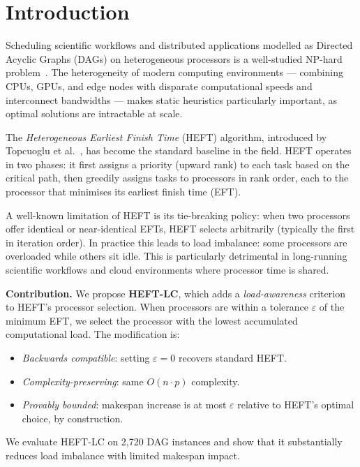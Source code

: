 \documentclass[conference]{IEEEtran}
\begin{document}
\section{Introduction}

Scheduling scientific workflows and distributed applications modelled as
Directed Acyclic Graphs (DAGs) on heterogeneous processors is a
well-studied NP-hard problem~\cite{ullman1975}. The heterogeneity of
modern computing environments --- combining CPUs, GPUs, and edge nodes
with disparate computational speeds and interconnect bandwidths --- makes
static heuristics particularly important, as optimal solutions are
intractable at scale.

The \textit{Heterogeneous Earliest Finish Time} (HEFT) algorithm,
introduced by Topcuoglu et al.~\cite{topcuoglu2002}, has become the
standard baseline in the field. HEFT operates in two phases: it first
assigns a priority (upward rank) to each task based on the critical path,
then greedily assigns tasks to processors in rank order, each to the
processor that minimises its earliest finish time (EFT).

A well-known limitation of HEFT is its tie-breaking policy: when two
processors offer identical or near-identical EFTs, HEFT selects
arbitrarily (typically the first in iteration order). In practice this
leads to load imbalance: some processors are overloaded while others sit
idle. This is particularly detrimental in long-running scientific
workflows and cloud environments where processor time is shared.

\textbf{Contribution.} We propose \textbf{HEFT-LC}, which adds a
\textit{load-awareness} criterion to HEFT's processor selection. When
processors are within a tolerance $\varepsilon$ of the minimum EFT, we
select the processor with the lowest accumulated computational load.
The modification is:
\begin{itemize}
  \item \textit{Backwards compatible}: setting $\varepsilon = 0$ recovers
        standard HEFT.
  \item \textit{Complexity-preserving}: same $O(n \cdot p)$ complexity.
  \item \textit{Provably bounded}: makespan increase is at most $\varepsilon$
        relative to HEFT's optimal choice, by construction.
\end{itemize}

We evaluate HEFT-LC on 2{,}720 DAG instances and show that it
substantially reduces load imbalance with limited makespan impact.
\end{document}
